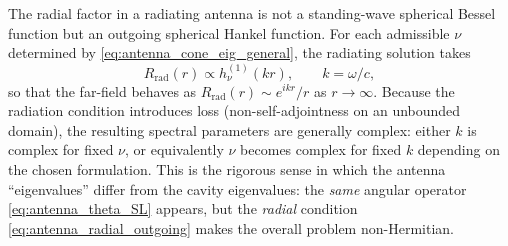 \documentclass[
  aip,
  amsmath,amssymb,
  preprint
]{revtex4-1}
\begin{document}
The radial factor in a radiating antenna is not a standing-wave spherical Bessel function but an outgoing spherical Hankel function. For each admissible $\nu$ determined by \eqref{eq:antenna_cone_eig_general}, the radiating solution takes
\begin{equation}
\label{eq:antenna_radial_outgoing}
R_{\mathrm{rad}}(r)\propto h_{\nu}^{(1)}(kr),
\qquad k=\omega/c,
\end{equation}
so that the far-field behaves as $R_{\mathrm{rad}}(r)\sim e^{ikr}/r$ as $r\to\infty$. Because the radiation condition introduces loss (non-self-adjointness on an unbounded domain), the resulting spectral parameters are generally complex: either $k$ is complex for fixed $\nu$, or equivalently $\nu$ becomes complex for fixed $k$ depending on the chosen formulation. This is the rigorous sense in which the antenna ``eigenvalues'' differ from the cavity eigenvalues: the \emph{same} angular operator \eqref{eq:antenna_theta_SL} appears, but the \emph{radial} condition \eqref{eq:antenna_radial_outgoing} makes the overall problem non-Hermitian.
\end{document}
